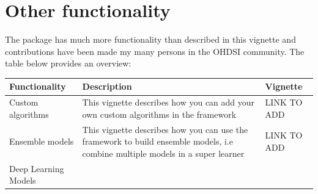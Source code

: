 \documentclass[]{article}
\begin{document}
\section{Other functionality}\label{other-functionality}

The package has much more functionality than described in this vignette
and contributions have been made my many persons in the OHDSI community.
The table below provides an overview:

\begin{longtable}[]{@{}lll@{}}
\toprule
\begin{minipage}[b]{0.19\columnwidth}\raggedright\strut
Functionality\strut
\end{minipage} & \begin{minipage}[b]{0.54\columnwidth}\raggedright\strut
Description\strut
\end{minipage} & \begin{minipage}[b]{0.19\columnwidth}\raggedright\strut
Vignette\strut
\end{minipage}\tabularnewline
\midrule
\endhead
\begin{minipage}[t]{0.19\columnwidth}\raggedright\strut
Custom algorithms\strut
\end{minipage} & \begin{minipage}[t]{0.54\columnwidth}\raggedright\strut
This vignette describes how you can add your own custom algorithms in
the framework\strut
\end{minipage} & \begin{minipage}[t]{0.19\columnwidth}\raggedright\strut
LINK TO ADD\strut
\end{minipage}\tabularnewline
\begin{minipage}[t]{0.19\columnwidth}\raggedright\strut
Ensemble models\strut
\end{minipage} & \begin{minipage}[t]{0.54\columnwidth}\raggedright\strut
This vignette describes how you can use the framework to build ensemble
models, i.e combine multiple models in a super learner\strut
\end{minipage} & \begin{minipage}[t]{0.19\columnwidth}\raggedright\strut
LINK TO ADD\strut
\end{minipage}\tabularnewline
\begin{minipage}[t]{0.19\columnwidth}\raggedright\strut
Deep Learning Models\strut
\end{minipage} & \begin{minipage}[t]{0.54\columnwidth}\raggedright\strut

\end{minipage}
\end{longtable}
\end{document}
